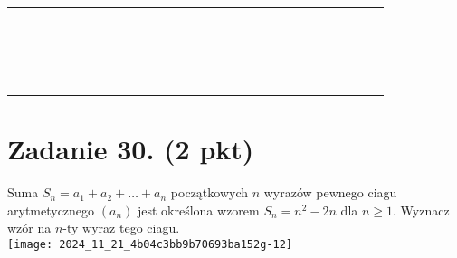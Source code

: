 \documentclass[10pt]{article}
\begin{document}
\begin{center}
\begin{tabular}{|c|c|c|c|c|c|c|c|c|c|c|c|c|c|c|c|c|c|c|c|c|c|c|c|c|c|}
\hline
 &  &  &  &  &  &  &  &  &  &  &  &  &  &  &  &  &  &  &  &  &  &  &  &  &  \\
\hline
 &  &  &  &  &  &  &  &  &  &  &  &  &  &  &  &  &  &  &  &  &  &  &  &  &  \\
\hline
 &  &  &  &  &  &  &  &  &  &  &  &  &  &  &  &  &  &  &  &  &  &  &  &  &  \\
\hline
 &  &  &  &  &  &  &  &  &  &  &  &  &  &  &  &  &  &  &  &  &  &  &  &  &  \\
\hline
 &  &  &  &  &  &  &  &  &  &  &  &  &  &  &  &  &  &  &  &  &  &  &  &  &  \\
\hline
 &  &  &  &  &  &  &  &  &  &  &  &  &  &  &  &  &  &  &  &  &  &  &  &  &  \\
\hline
 &  &  &  &  &  &  &  &  &  &  &  &  &  &  &  &  &  &  &  &  &  &  &  &  &  \\
\hline
 &  &  &  &  &  &  &  &  &  &  &  &  &  &  &  &  &  &  &  &  &  &  &  &  &  \\
\hline
 &  &  &  &  &  &  &  &  &  &  &  &  &  &  &  &  &  &  &  &  &  &  &  &  &  \\
\hline
 &  &  &  &  &  &  &  &  &  &  &  &  &  &  &  &  &  &  &  &  &  &  &  &  &  \\
\hline
 &  &  &  &  &  &  &  &  &  &  &  &  &  &  &  &  &  &  &  &  &  &  &  &  &  \\
\hline
 &  &  &  &  &  &  &  &  &  &  &  &  &  &  &  &  &  &  &  &  &  &  &  &  &  \\
\hline
 &  &  &  &  &  &  &  &  &  &  &  &  &  &  &  &  &  &  &  &  &  &  &  &  &  \\
\hline
 &  &  &  &  &  &  &  &  &  &  &  &  &  &  &  &  &  &  &  &  &  &  &  &  &  \\
\hline
 &  &  &  &  &  &  &  &  &  &  &  &  &  &  &  &  &  &  &  &  &  &  &  &  &  \\
\hline
 &  &  &  &  &  &  &  &  &  &  &  &  &  &  &  &  &  &  &  &  &  &  &  &  &  \\
\hline
 &  &  &  &  &  &  &  &  &  &  &  &  &  &  &  &  &  &  &  &  &  &  &  &  &  \\
\hline
\end{tabular}
\end{center}

\section*{Zadanie 30. (2 pkt)}
Suma \(S_{n}=a_{1}+a_{2}+\ldots+a_{n}\) początkowych \(n\) wyrazów pewnego ciagu arytmetycznego \(\left(a_{n}\right)\) jest określona wzorem \(S_{n}=n^{2}-2 n\) dla \(n \geq 1\). Wyznacz wzór na \(n\)-ty wyraz tego ciagu.\\
\texttt{[image: 2024\_11\_21\_4b04c3bb9b70693ba152g-12]}
\end{document}
